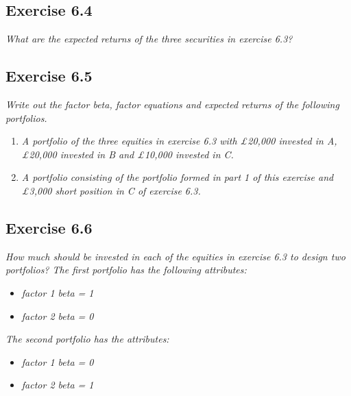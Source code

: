 \documentclass[]{book}
\theoremstyle{definition}
\theoremstyle{definition}
\theoremstyle{remark}
\begin{document}
\subsection{Exercise 6.4}\label{exercise-6.4}

\emph{What are the expected returns of the three securities in exercise
6.3?} \citep[p.198]{book}

\subsection{Exercise 6.5}\label{exercise-6.5}

\emph{Write out the factor beta, factor equations and expected returns
of the following portfolios.} \citep[p.198]{book}

\begin{enumerate}
\def\labelenumi{\arabic{enumi}.}
\item
  \emph{A portfolio of the three equities in exercise 6.3 with £20,000
  invested in A, £20,000 invested in B and £10,000 invested in C.}
  \citep[p.198]{book}
\item
  \emph{A portfolio consisting of the portfolio formed in part 1 of this
  exercise and £3,000 short position in C of exercise 6.3.}
  \citep[p.198]{book}
\end{enumerate}

\subsection{Exercise 6.6}\label{exercise-6.6}

\emph{How much should be invested in each of the equities in exercise
6.3 to design two portfolios? The first portfolio has the following
attributes:} \citep[p.198]{book}

\begin{itemize}
\item
  \emph{factor 1 beta = 1} \citep[p.198]{book}
\item
  \emph{factor 2 beta = 0} \citep[p.198]{book}
\end{itemize}

\emph{The second portfolio has the attributes:} \citep[p.198]{book}

\begin{itemize}
\item
  \emph{factor 1 beta = 0} \citep[p.198]{book}
\item
  \emph{factor 2 beta = 1} \citep[p.198]{book}
\end{itemize}
\end{document}
